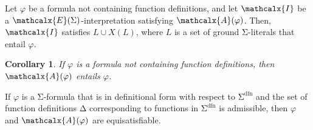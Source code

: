 \documentclass[runningheads,a4paper]{llncs}
\newcommand\DDD{\Delta}
\let\oldSigma=\Sigma
\def\Sigma{\mathrm{\oldSigma}}
\let\oldDelta=\Delta
\def\Delta{\mathrm{\oldDelta}}
\newcommand{\I}{\mathcalx{I}}
\newcommand{\conv}{\mathcalx{A}}
\newcommand{\sfundefs}[1]{#1^\mathrm{dfn}}
\newcommand{\extendsig}[1]{\mathcalx{E}( #1 )}
\newcommand{\absconstraints}{X}
\newtheorem{cor}{Corollary}
\begin{document}
\begin{lemma}\label{lem:conv}
Let $\varphi$ be a formula not containing function definitions,
and let $\I$ be a $\extendsig{\Sigma}$-interpretation satisfying $\conv( \varphi )$.
Then, $\I$ satisfies $L \cup \absconstraints( L )$, where $L$ is a set of ground $\Sigma$-literals that entail $\varphi$.
\end{lemma}

\begin{cor}\label{cor:conv}
If $\varphi$ is a formula not containing function definitions, then $\conv( \varphi )$ entails $\varphi$.
\end{cor}

\begin{theorem}\label{thm:equi}
If $\varphi$ is a\/ $\Sigma$-formula that is in definitional form with respect to\/
$\sfundefs{\Sigma}$
and the set of function definitions\/ $\DDD$ corresponding to functions in
$\sfundefs{\Sigma}$ is admissible, then\/ $\varphi$ and\/ $\conv( \varphi )$ are
equisatisfiable.
\end{theorem}
\end{document}
